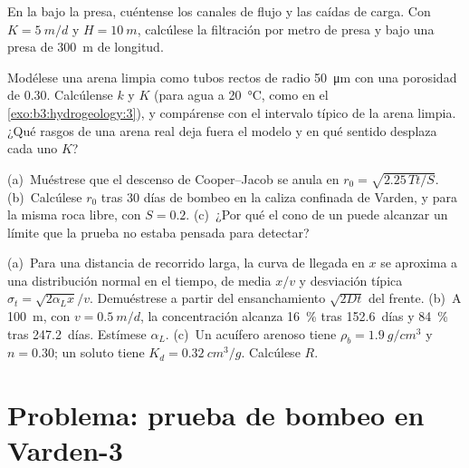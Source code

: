\begin{exercise}[$\star\star$]\label{exo:b3:hydrogeology:9}
En la  bajo la presa, cuéntense los canales de flujo y las caídas de carga.
Con $K = \qty{5}{m/d}$ y $H = \qty{10}{m}$, calcúlese la filtración por
metro de presa y bajo una presa de \qty{300}{m} de longitud.
\end{exercise}

\begin{exercise}[$\star\star\star$]\label{exo:b3:hydrogeology:10}
Modélese una arena limpia como tubos rectos de radio \qty{50}{\micro\metre} con una
porosidad de 0.30. Calcúlense $k$ y $K$ (para agua a \qty{20}{\celsius}, como en el
\cref{exo:b3:hydrogeology:3}),
y compárense con el intervalo típico de la arena limpia. ¿Qué rasgos de una arena real
deja fuera el modelo y en qué sentido desplaza cada uno $K$?
\end{exercise}

\begin{exercise}[$\star\star\star$]\label{exo:b3:hydrogeology:11}
(a)~Muéstrese que el descenso de Cooper--Jacob se anula en $r_0 =
\sqrt{2.25\,Tt/S}$. (b)~Calcúlese $r_0$ tras 30 días de bombeo en la
caliza confinada de Varden, y para la misma roca libre, con $S =
0.2$. (c)~¿Por qué el cono de un  puede alcanzar un límite que la
prueba no estaba pensada para detectar?
\end{exercise}

\begin{exercise}[$\star\star\star$]\label{exo:b3:hydrogeology:12}
(a)~Para una distancia de recorrido larga, la curva de llegada en $x$ se aproxima a una
distribución normal en el tiempo, de media $x/v$ y desviación típica $\sigma_t
= \sqrt{2\alpha_Lx}/v$. Demuéstrese a partir del ensanchamiento $\sqrt{2Dt}$ del frente.
(b)~A \qty{100}{m}, con $v = \qty{0.5}{m/d}$, la concentración alcanza
\qty{16}{\percent} tras \num{152.6}~días y \qty{84}{\percent} tras
\num{247.2}~días. Estímese $\alpha_L$. (c)~Un acuífero arenoso tiene $\rho_b =
\qty{1.9}{g/cm^3}$ y $n = 0.30$; un soluto tiene $K_d =
\qty{0.32}{cm^3/g}$. Calcúlese $R$.
\end{exercise}

\section{Problema: prueba de bombeo en Varden-3}

